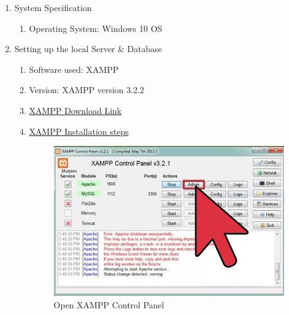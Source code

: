 \documentclass[a4paper,12pt,oneside]{book}
\begin{document}
\begin{enumerate}
\begin{figure}[h]
	\end{figure}
					\item System Specification
					\begin{enumerate}
						\item Operating System: Windows 10 OS
					\end{enumerate}
					\item Setting up the local Server \& Database
					\begin{enumerate}
						\item Software used: XAMPP
						\item Version: XAMPP version 3.2.2
						\item \href{https://www.apachefriends.org/download.html}{XAMPP Download Link}
						\item \href{http://www.wikihow.com/Install-XAMPP-for-Windows}{XAMPP Installation steps}
						\hspace{20px}
						
						\begin{figure}[H]  \centering
							\includegraphics[width=13cm]{xampp3.png}
							\caption{Open XAMPP Control Panel}
						\end{figure}
						

\end{enumerate}
\end{enumerate}
\end{document}
